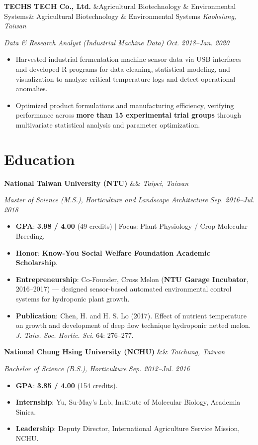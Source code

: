 \documentclass[10pt,a4paper]{article}
\newcommand{\entryheader}[3]{%
  \noindent%
  \textbf{\color{maindark}#1}%
  \ifx&#2&%
  \else%
    { \small\color{subgray}#2}%
  \fi%
  \hfill%
  \textit{\color{locationcoral}#3}\par%
}
\newcommand{\entrysubheader}[2]{%
  \noindent%
  \textit{\color{subgray}#1}%
  \hfill%
  \textit{\color{subgray}#2}\par%
  \vspace{1.5pt}%
}
\begin{document}
\entryheader{TECHS TECH Co., Ltd.}{Agricultural Biotechnology \& Environmental Systems}{Kaohsiung, Taiwan}
\entrysubheader{Data \& Research Analyst (Industrial Machine Data)}{Oct. 2018--Jan. 2020}
\begin{itemize}
    \item {Harvested industrial fermentation machine sensor data via USB interfaces and developed R programs for data cleaning, statistical modeling, and visualization to analyze critical temperature logs and detect operational anomalies.}
    \item {Optimized product formulations and manufacturing efficiency, verifying performance across \textbf{more than 15 experimental trial groups} through multivariate statistical analysis and parameter optimization.}
\end{itemize}

\section{Education}

\entryheader{National Taiwan University (NTU)}{}{Taipei, Taiwan}
\entrysubheader{Master of Science (M.S.), Horticulture and Landscape Architecture}{Sep. 2016--Jul. 2018}
\begin{itemize}
    \item \textbf{GPA}: \textbf{3.98 / 4.00} (49 credits) $|$ Focus: Plant Physiology / Crop Molecular Breeding.
    \item \textbf{Honor}: \textbf{Know-You Social Welfare Foundation Academic Scholarship}.
    \item \textbf{Entrepreneurship}: Co-Founder, Cross Melon (\textbf{NTU Garage Incubator}, 2016--2017) --- designed sensor-based automated environmental control systems for hydroponic plant growth.
    \item \textbf{Publication}: Chen, H. and H. S. Lo (2017). Effect of nutrient temperature on growth and development of deep flow technique hydroponic netted melon. \textit{J. Taiw. Soc. Hortic. Sci.} 64: 276--277.
\end{itemize}

\vspace{3pt}

\entryheader{National Chung Hsing University (NCHU)}{}{Taichung, Taiwan}
\entrysubheader{Bachelor of Science (B.S.), Horticulture}{Sep. 2012--Jul. 2016}
\begin{itemize}
    \item \textbf{GPA}: \textbf{3.85 / 4.00} (154 credits).
    \item \textbf{Internship}: Yu, Su-May's Lab, Institute of Molecular Biology, Academia Sinica.
    \item \textbf{Leadership}: Deputy Director, International Agriculture Service Mission, NCHU.
\end{itemize}
\end{document}
